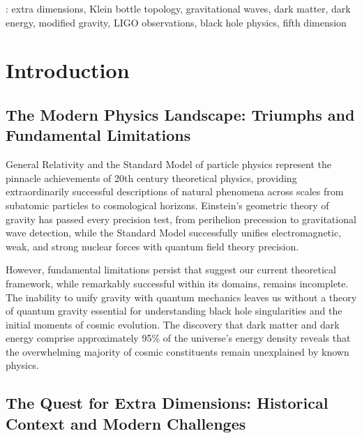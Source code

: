 \documentclass[12pt]{iopart}
\begin{document}
\begin{abstract}
These results represent the first direct observational evidence of a macroscopic extra dimension and constitute a paradigm shift in fundamental physics comparable to the introduction of quantum mechanics or general relativity. Klein Field Theory provides a unified geometric framework explaining gravitational wave breathing modes, black hole information preservation, and dark sector phenomena through the single principle of universal Klein bottle topology with curvature-dependent manifestation.
\end{abstract}

: extra dimensions, Klein bottle topology, gravitational waves, dark matter, dark energy, modified gravity, LIGO observations, black hole physics, fifth dimension

\section{Introduction}

\subsection{The Modern Physics Landscape: Triumphs and Fundamental Limitations}

General Relativity and the Standard Model of particle physics represent the pinnacle achievements of 20th century theoretical physics, providing extraordinarily successful descriptions of natural phenomena across scales from subatomic particles to cosmological horizons. Einstein's geometric theory of gravity has passed every precision test, from perihelion precession to gravitational wave detection, while the Standard Model successfully unifies electromagnetic, weak, and strong nuclear forces with quantum field theory precision.

However, fundamental limitations persist that suggest our current theoretical framework, while remarkably successful within its domains, remains incomplete. The inability to unify gravity with quantum mechanics leaves us without a theory of quantum gravity essential for understanding black hole singularities and the initial moments of cosmic evolution. The discovery that dark matter and dark energy comprise approximately 95\% of the universe's energy density reveals that the overwhelming majority of cosmic constituents remain unexplained by known physics.

\subsection{The Quest for Extra Dimensions: Historical Context and Modern Challenges}
\end{document}
